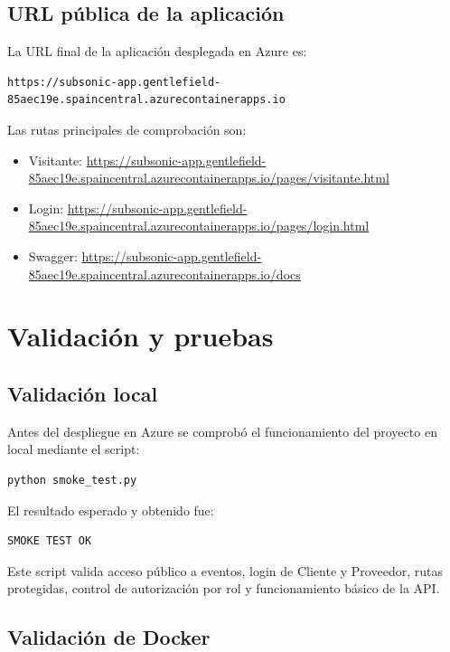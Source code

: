 \documentclass[11pt,a4paper]{article}
\begin{document}
\subsection{URL p\'ublica de la aplicaci\'on}

La URL final de la aplicaci\'on desplegada en Azure es:

\begin{verbatim}
https://subsonic-app.gentlefield-85aec19e.spaincentral.azurecontainerapps.io
\end{verbatim}

Las rutas principales de comprobaci\'on son:

\begin{itemize}
  \item Visitante: \url{https://subsonic-app.gentlefield-85aec19e.spaincentral.azurecontainerapps.io/pages/visitante.html}
  \item Login: \url{https://subsonic-app.gentlefield-85aec19e.spaincentral.azurecontainerapps.io/pages/login.html}
  \item Swagger: \url{https://subsonic-app.gentlefield-85aec19e.spaincentral.azurecontainerapps.io/docs}
\end{itemize}

\section{Validaci\'on y pruebas}

\subsection{Validaci\'on local}

Antes del despliegue en Azure se comprob\'o el funcionamiento del proyecto en local mediante el script:

\begin{verbatim}
python smoke_test.py
\end{verbatim}

El resultado esperado y obtenido fue:

\begin{verbatim}
SMOKE TEST OK
\end{verbatim}

Este script valida acceso p\'ublico a eventos, login de Cliente y Proveedor, rutas protegidas, control de autorizaci\'on por rol y funcionamiento b\'asico de la API.

\subsection{Validaci\'on de Docker}
\end{document}

